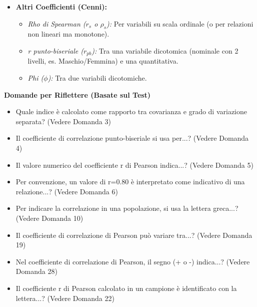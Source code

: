 \documentclass[12pt, a4paper]{article}
\newenvironment{reflectionbox}{%
    \medskip
    \begin{framed}\par\noindent
    \textbf{\color{boxtitlecolor}Domande per Riflettere (Basate sul Test)} \par
    \begin{itemize}[leftmargin=*, label=$\blacktriangleright$]
}{%
    \end{itemize}\par
    \end{framed}
    \medskip
}
\begin{document}
\begin{itemize}
\begin{itemize}
        \end{itemize}
    \item \textbf{Altri Coefficienti (Cenni):}
        \begin{itemize}
            \item \textit{Rho di Spearman ($r_s$ o $\rho_s$):} Per variabili su scala ordinale (o per relazioni non lineari ma monotone).
            \item \textit{r punto-biseriale ($r_{pb}$):} Tra una variabile dicotomica (nominale con 2 livelli, es. Maschio/Femmina) e una quantitativa.
            \item \textit{Phi ($\phi$):} Tra due variabili dicotomiche.
        \end{itemize}
\end{itemize}

\begin{reflectionbox}
    \item Quale indice è calcolato come rapporto tra covarianza e grado di variazione separata? (Vedere Domanda 3)
    \item Il coefficiente di correlazione punto-biseriale si usa per...? (Vedere Domanda 4)
    \item Il valore numerico del coefficiente r di Pearson indica...? (Vedere Domanda 5)
    \item Per convenzione, un valore di r=0.80 è interpretato come indicativo di una relazione...? (Vedere Domanda 6)
    \item Per indicare la correlazione in una popolazione, si usa la lettera greca...? (Vedere Domanda 10)
    \item Il coefficiente di correlazione di Pearson può variare tra...? (Vedere Domanda 19)
    \item Nel coefficiente di correlazione di Pearson, il segno (+ o -) indica...? (Vedere Domanda 28)
    \item Il coefficiente r di Pearson calcolato in un campione è identificato con la lettera...? (Vedere Domanda 22)
\end{reflectionbox}
\end{document}
